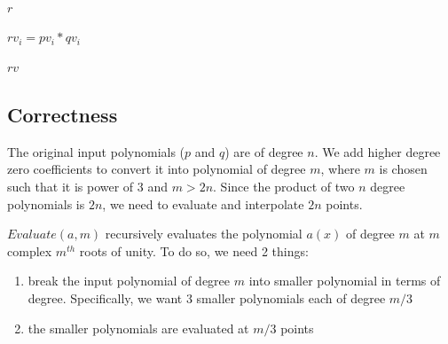 \documentclass{article}
\begin{document}
\begin{algorithm}[H]
\begin{algorithmic}
                    \State {}
                    \State {}
                \EndProcedure

                    \State {}
                    \State {} \\

                    \State {}
                    \State {} \\

                        \State {}
                    \EndFor \\

                    \State \Return $r$
                \EndProcedure

                        \State $rv_i = pv_i * qv_i$
                    \EndFor

                    \State \Return $rv$
                \EndProcedure
            \end{algorithmic}
        \end{algorithm}

    \subsection*{Correctness}
    The original input polynomials ($p$ and $q$) are of degree $n$. We add higher degree zero coefficients to convert it into polynomial of degree $m$, where $m$ is chosen such that it is power of 3 and $m > 2n$. Since the product of two $n$ degree polynomials is $2n$, we need to evaluate and interpolate $2n$ points.

    $Evaluate(a, m)$ recursively evaluates the polynomial $a(x)$ of degree $m$ at $m$ complex $m^{th}$ roots of unity. To do so, we need 2 things:
    \begin{enumerate}
        \item break the input polynomial of degree $m$ into smaller polynomial in terms of degree. Specifically, we want 3 smaller polynomials each of degree $m/3$
        \item the smaller polynomials are evaluated at $m/3$ points
    \end{enumerate}
\end{document}

